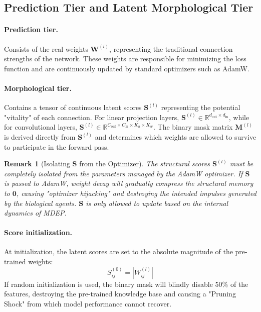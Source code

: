 \documentclass[11pt, a4paper]{article}
\newcommand{\R}{\mathbb{R}}
\newtheorem{remark}{Remark}
\begin{document}
\subsection{Prediction Tier and Latent Morphological Tier}\label{subsec:two_tiers}

\paragraph{Prediction tier.}
Consists of the real weights $\bm{W}^{(l)}$, representing the traditional connection strengths of the network. These weights are responsible for minimizing the loss function and are continuously updated by standard optimizers such as AdamW.

\paragraph{Morphological tier.}
Contains a tensor of continuous latent scores $\bm{S}^{(l)}$ representing the potential "vitality" of each connection. For linear projection layers, $\bm{S}^{(l)} \in \R^{d_{\text{out}} \times d_{\text{in}}}$, while for convolutional layers, $\bm{S}^{(l)} \in \R^{C_{\text{out}} \times C_{\text{in}} \times K_h \times K_w}$. The binary mask matrix $\bm{M}^{(l)}$ is derived directly from $\bm{S}^{(l)}$ and determines which weights are allowed to survive to participate in the forward pass.

\begin{remark}[Isolating $\bm{S}$ from the Optimizer]
The structural scores $\bm{S}^{(l)}$ must be completely isolated from the parameters managed by the AdamW optimizer. If $\bm{S}$ is passed to AdamW, weight decay will gradually compress the structural memory to $\bm{0}$, causing "optimizer hijacking" and destroying the intended impulses generated by the biological agents. $\bm{S}$ is only allowed to update based on the internal dynamics of MDEP.
\end{remark}

\paragraph{Score initialization.}
At initialization, the latent scores are set to the absolute magnitude of the pre-trained weights:
\begin{equation}\label{eq:score_init}
    S_{ij}^{(0)} = |W_{ij}^{(l)}|
\end{equation}
If random initialization is used, the binary mask will blindly disable 50\% of the features, destroying the pre-trained knowledge base and causing a "Pruning Shock" from which model performance cannot recover.
\end{document}
